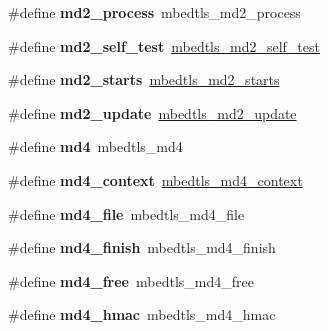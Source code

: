 \begin{DoxyCompactItemize}
\mbox{\label{compat-1_83_8h_a566135d2ce5804f7bde608b5b29b329c}} 
\#define {\bfseries md2\+\_\+process}~mbedtls\+\_\+md2\+\_\+process
\item 
\mbox{\label{compat-1_83_8h_a7ca897c07d6f2497558cf1db94b5b622}} 
\#define {\bfseries md2\+\_\+self\+\_\+test}~\mbox{\hyperlink{md2_8h_a3105f3b90315ffa54e2923c89f680d9f}{mbedtls\+\_\+md2\+\_\+self\+\_\+test}}
\item 
\mbox{\label{compat-1_83_8h_aba8de0b243806101a101ee632a820c41}} 
\#define {\bfseries md2\+\_\+starts}~\mbox{\hyperlink{md2_8h_a382611d7c80ee04c4cacb8ea1ce63603}{mbedtls\+\_\+md2\+\_\+starts}}
\item 
\mbox{\label{compat-1_83_8h_aeb099fc9e036e5aacae4ce8ad798904a}} 
\#define {\bfseries md2\+\_\+update}~\mbox{\hyperlink{md2_8h_a4c557d51eb64f85549a89ea54f23fa9a}{mbedtls\+\_\+md2\+\_\+update}}
\item 
\mbox{\label{compat-1_83_8h_a60deb22fe24a2cc9b0d7c12b11f1aa37}} 
\#define {\bfseries md4}~mbedtls\+\_\+md4
\item 
\mbox{\label{compat-1_83_8h_ac75a502f3d4f66330071a42d00cd1bf5}} 
\#define {\bfseries md4\+\_\+context}~\mbox{\hyperlink{structmbedtls__md4__context}{mbedtls\+\_\+md4\+\_\+context}}
\item 
\mbox{\label{compat-1_83_8h_a52353c031dde8df478d1a35b2b393a05}} 
\#define {\bfseries md4\+\_\+file}~mbedtls\+\_\+md4\+\_\+file
\item 
\mbox{\label{compat-1_83_8h_a431c0ca26012a769de348fda858c529f}} 
\#define {\bfseries md4\+\_\+finish}~mbedtls\+\_\+md4\+\_\+finish
\item 
\mbox{\label{compat-1_83_8h_a7df196c174bae1fcabdede49cf8eb5fa}} 
\#define {\bfseries md4\+\_\+free}~mbedtls\+\_\+md4\+\_\+free
\item 
\mbox{\label{compat-1_83_8h_aea919c027da709ad09c7fdfb80d72d81}} 
\#define {\bfseries md4\+\_\+hmac}~mbedtls\+\_\+md4\+\_\+hmac
\item 

\end{DoxyCompactItemize}
